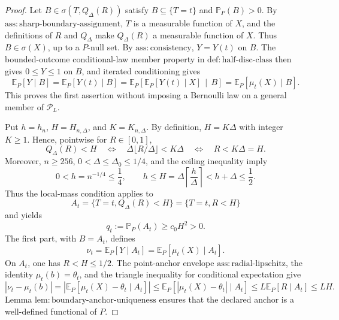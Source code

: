 \documentclass{article}
\begin{document}
\begin{proof}
Let \(B\in\sigma(T,Q_\Delta(R))\) satisfy \(B\subseteq\{T=t\}\) and \(\mathbb P_P(B)>0\).  By \(\mathrm{ass:sharp\text{-}boundary\text{-}assignment}\), \(T\) is a measurable function of \(X\), and the definitions of \(R\) and \(Q_\Delta\) make \(Q_\Delta(R)\) a measurable function of \(X\).  Thus \(B\in\sigma(X)\), up to a \(P\)-null set.  By \(\mathrm{ass:consistency}\), \(Y=Y(t)\) on \(B\).  The bounded-outcome conditional-law member property in \(\mathrm{def:half\text{-}disc\text{-}class}\) then gives \(0\leq Y\leq1\) on \(B\), and iterated conditioning gives
\[
 \mathbb E_P[Y\mid B]
 =\mathbb E_P[Y(t)\mid B]
 =\mathbb E_P\!\left[\mathbb E_P[Y(t)\mid X]\,\middle|\,B\right]
 =\mathbb E_P[\mu_t(X)\mid B].
\]
This proves the first assertion without imposing a Bernoulli law on a general member of \(\mathcal P_L\).

Put \(h=h_n\), \(H=H_{n,\Delta}\), and \(K=K_{n,\Delta}\).  By definition, \(H=K\Delta\) with integer \(K\geq1\).  Hence, pointwise for \(R\in[0,1]\),
\[
 Q_\Delta(R)<H
 \quad\Longleftrightarrow\quad
 \Delta\lfloor R/\Delta\rfloor<K\Delta
 \quad\Longleftrightarrow\quad
 R<K\Delta=H.
\]
Moreover, \(n\geq256\), \(0<\Delta\leq\Delta_0\leq1/4\), and the ceiling inequality imply
\[
 0<h=n^{-1/4}\leq\frac14,
 \qquad
 h\leq H=\Delta\left\lceil\frac h\Delta\right\rceil<h+\Delta\leq\frac12.
\]
Thus the local-mass condition applies to
\[
 A_t=\{T=t,Q_\Delta(R)<H\}=\{T=t,R<H\}
\]
and yields
\[
 q_t:=\mathbb P_P(A_t)\geq c_0H^2>0.
\]
The first part, with \(B=A_t\), defines
\[
 \nu_t=\mathbb E_P[Y\mid A_t]
      =\mathbb E_P[\mu_t(X)\mid A_t].
\]
On \(A_t\), one has \(R<H\leq1/2\).  The point-anchor envelope \(\mathrm{ass:radial\text{-}lipschitz}\), the identity \(\mu_t(b)=\theta_t\), and the triangle inequality for conditional expectation give
\[
 \left|\nu_t-\mu_t(b)\right|
 =\left|\mathbb E_P[\mu_t(X)-\theta_t\mid A_t]\right|
 \leq\mathbb E_P[|\mu_t(X)-\theta_t|\mid A_t]
 \leq L\mathbb E_P[R\mid A_t]
 \leq LH.
\]
Lemma \(\mathrm{lem:boundary\text{-}anchor\text{-}uniqueness}\) ensures that the declared anchor is a well-defined functional of \(P\).


\end{proof}
\end{document}

